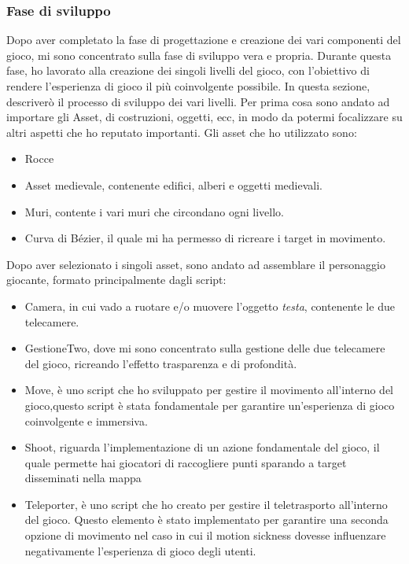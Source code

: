 \documentclass[10pt,a4paper]{article}
\begin{document}
    \subsubsection{Fase di sviluppo}
    Dopo aver completato la fase di progettazione e creazione dei vari componenti del gioco, mi sono concentrato sulla fase di sviluppo vera e propria. Durante questa fase, ho lavorato alla creazione dei singoli livelli del gioco, con l'obiettivo di rendere l'esperienza di gioco il più coinvolgente possibile. In questa sezione, descriverò il processo di sviluppo dei vari livelli.
    Per prima cosa sono andato ad importare gli Asset, di costruzioni, oggetti, ecc, in modo da potermi focalizzare su altri aspetti che ho reputato importanti.
    Gli asset che ho utilizzato sono:
    \begin{itemize}
    	\item Rocce\cite{Rock_asset}
    	\item Asset medievale\cite{Pack_asset}, contenente edifici, alberi e oggetti medievali. 
    	\item Muri\cite{Wall_asset}, contente i vari muri che circondano ogni livello.
    	\item Curva di Bézier\cite{Pack_asset}, il quale mi ha permesso di ricreare i target in movimento.
    \end{itemize}
    Dopo aver selezionato i singoli asset, sono andato ad assemblare il personaggio giocante, formato principalmente dagli script:
    \begin{itemize}
        \item Camera, in cui vado a ruotare e/o muovere l'oggetto \textit{testa}, contenente le due telecamere.
        \item GestioneTwo, dove mi sono concentrato sulla gestione delle due telecamere del gioco, ricreando l'effetto trasparenza e di profondità.
        \item Move, è uno script che ho sviluppato per gestire il movimento all'interno del gioco,questo script è stata fondamentale per garantire un'esperienza di gioco coinvolgente e immersiva.
        \item Shoot, riguarda l'implementazione di un azione fondamentale del gioco, il quale permette hai giocatori di raccogliere punti sparando a target disseminati nella mappa
        \item Teleporter, è uno script che ho creato per gestire il teletrasporto all'interno del gioco. Questo elemento è stato implementato per garantire una seconda opzione di movimento nel caso in cui il motion sickness\cite{mottion_sickness} dovesse influenzare negativamente l'esperienza di gioco degli utenti.
    \end{itemize}
\end{document}
